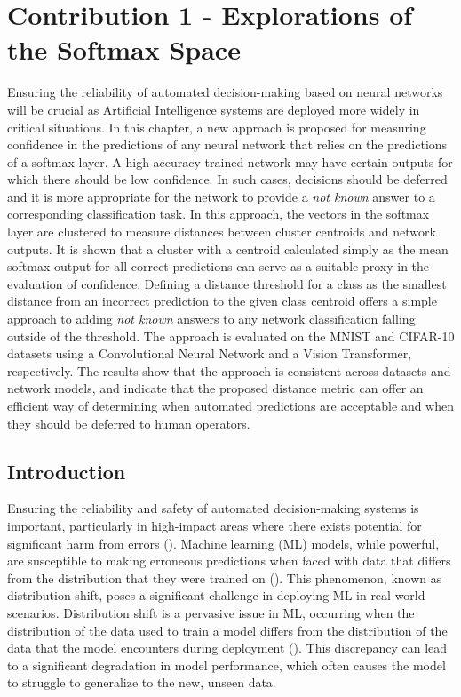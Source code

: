 \chapter{Contribution 1 - Explorations of the Softmax Space}

Ensuring the reliability of automated decision-making based on neural networks will be crucial as Artificial Intelligence systems are deployed more widely in critical situations. In this chapter, a new approach is proposed for measuring confidence in the predictions of any neural network that relies on the predictions of a softmax layer. A high-accuracy trained network may have certain outputs for which there should be low confidence. In such cases, decisions should be deferred and it is more appropriate for the network to provide a \textit{not known} answer to a corresponding classification task. In this approach, the vectors in the softmax layer are clustered to measure distances between cluster centroids and network outputs. It is shown that a cluster with a centroid calculated simply as the mean softmax output for all correct predictions can serve as a suitable proxy in the evaluation of confidence. Defining a distance threshold for a class as the smallest distance from an incorrect prediction to the given class centroid offers a simple approach to adding \textit{not known} answers to any network classification falling outside of the threshold. The approach is evaluated on the MNIST and CIFAR-10 datasets using a Convolutional Neural Network and a Vision Transformer, respectively.
The results show that the approach is consistent across datasets and network models, and indicate that the proposed distance metric can offer an efficient way of determining when automated predictions are acceptable and when they should be deferred to human operators. 


\section{Introduction}

Ensuring the reliability and safety of automated decision-making systems is important, particularly in high-impact areas where there exists potential for significant harm from errors (\cite{amodei2016concrete}). 
Machine learning (ML) models, while powerful, are susceptible to making erroneous predictions when faced with data that differs from the distribution that they were trained on (\cite{hendrycks2021many}). 
This phenomenon, known as distribution shift, poses a significant challenge in deploying ML in real-world scenarios. Distribution shift is a pervasive issue in ML, occurring when the distribution of the data used to train a model differs from the distribution of the data that the model encounters during deployment (\cite{quinonero2009dataset}). This discrepancy can lead to a significant degradation in model performance, which often causes the model to struggle to generalize to the new, unseen data.

